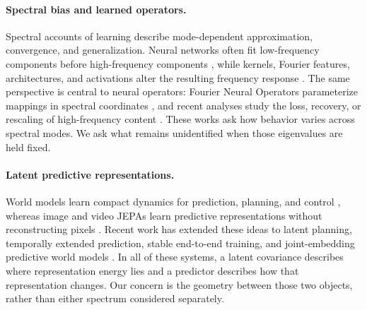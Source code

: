 \documentclass{article}
\begin{document}
\paragraph{Spectral bias and learned operators.}
Spectral accounts of learning describe mode-dependent approximation, convergence, and generalization. Neural networks often fit low-frequency components before high-frequency components \citep{rahaman2019spectralbias,cao2019spectralbias}, while kernels, Fourier features, architectures, and activations alter the resulting frequency response \citep{jacot2018ntk,tancik2020fourier,hong2022activation,fridovichkeil2022spectralpractice}. The same perspective is central to neural operators: Fourier Neural Operators parameterize mappings in spectral coordinates \citep{li2021fno}, and recent analyses study the loss, recovery, or rescaling of high-frequency content \citep{khodakarami2026hfs,perrone2026freqnodps,xie2026frequencybias,sun2026s2rl}. These works ask how behavior varies across spectral modes. We ask what remains unidentified when those eigenvalues are held fixed.

\paragraph{Latent predictive representations.}
World models learn compact dynamics for prediction, planning, and control \citep{ha2018worldmodels,hafner2020dreamer,hafner2023dreamerv3,micheli2023iris,hansen2024tdmpc2}, whereas image and video JEPAs learn predictive representations without reconstructing pixels \citep{assran2023ijepa,bardes2024vjepa,assran2025vjepa2}. Recent work has extended these ideas to latent planning, temporally extended prediction, stable end-to-end training, and joint-embedding predictive world models \citep{maeslelidec2026lewm,zhang2026hwm,du2026vlwm,ding2026worldmodels,terver2025jepawm}. In all of these systems, a latent covariance describes where representation energy lies and a predictor describes how that representation changes. Our concern is the geometry between those two objects, rather than either spectrum considered separately.
\end{document}
